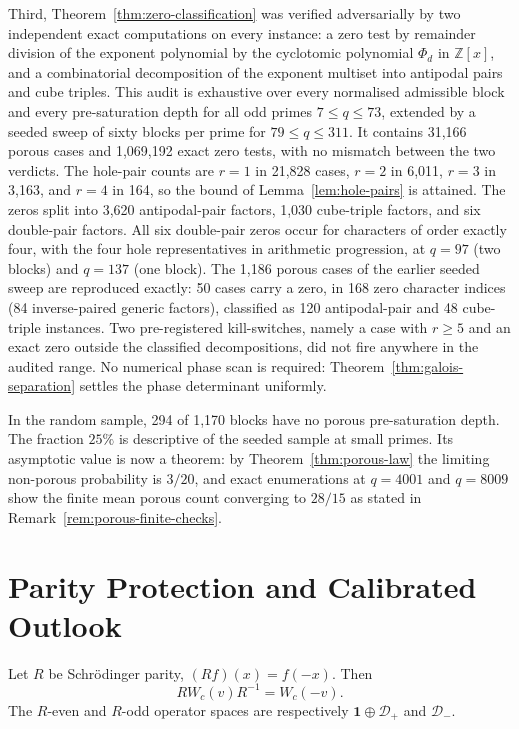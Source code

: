 \documentclass[11pt,a4paper]{article}
\theoremstyle{definition}
\theoremstyle{remark}
\newcommand{\Id}{\mathbf{1}}
\newcommand{\Dplus}{\mathcal{D}_{+}}
\newcommand{\Dminus}{\mathcal{D}_{-}}
\begin{document}
Third, Theorem~\ref{thm:zero-classification} was verified adversarially by two independent
exact computations on every instance: a zero test by remainder division of the exponent
polynomial by the cyclotomic polynomial $\Phi_d$ in $\mathbb{Z}[x]$, and a combinatorial
decomposition of the exponent multiset into antipodal pairs and cube triples.
This audit is exhaustive over every normalised admissible block and every pre-saturation
depth for all odd primes $7\leq q\leq73$, extended by a seeded sweep of sixty blocks per
prime for $79\leq q\leq311$.
It contains 31,166 porous cases and 1,069,192 exact zero tests, with no mismatch between the
two verdicts.
The hole-pair counts are $r=1$ in 21,828 cases, $r=2$ in 6,011, $r=3$ in 3,163, and $r=4$
in 164, so the bound of Lemma~\ref{lem:hole-pairs} is attained.
The zeros split into 3,620 antipodal-pair factors, 1,030 cube-triple factors, and six
double-pair factors.
All six double-pair zeros occur for characters of order exactly four, with the four hole
representatives in arithmetic progression, at $q=97$ (two blocks) and $q=137$ (one block).
The 1,186 porous cases of the earlier seeded sweep are reproduced exactly: 50 cases carry a
zero, in 168 zero character indices (84 inverse-paired generic factors), classified as 120
antipodal-pair and 48 cube-triple instances.
Two pre-registered kill-switches, namely a case with $r\geq5$ and an exact zero outside the
classified decompositions, did not fire anywhere in the audited range.
No numerical phase scan is required: Theorem~\ref{thm:galois-separation} settles the phase
determinant uniformly.

In the random sample, 294 of 1,170 blocks have no porous pre-saturation depth.
The fraction $25\%$ is descriptive of the seeded sample at small primes.
Its asymptotic value is now a theorem: by Theorem~\ref{thm:porous-law} the limiting
non-porous probability is $3/20$, and exact enumerations at $q=4001$ and $q=8009$ show the
finite mean porous count converging to $28/15$ as stated in
Remark~\ref{rem:porous-finite-checks}.

\section{Parity Protection and Calibrated Outlook}
\label{sec:conclusion}

Let $R$ be Schr\"odinger parity, $(Rf)(x)=f(-x)$.
Then
\begin{equation}
  RW_c(v)R^{-1}=W_c(-v).
  \label{eq:parity-weyl}
\end{equation}
The $R$-even and $R$-odd operator spaces are respectively
$\Id\oplus\Dplus$ and $\Dminus$.
\end{document}

